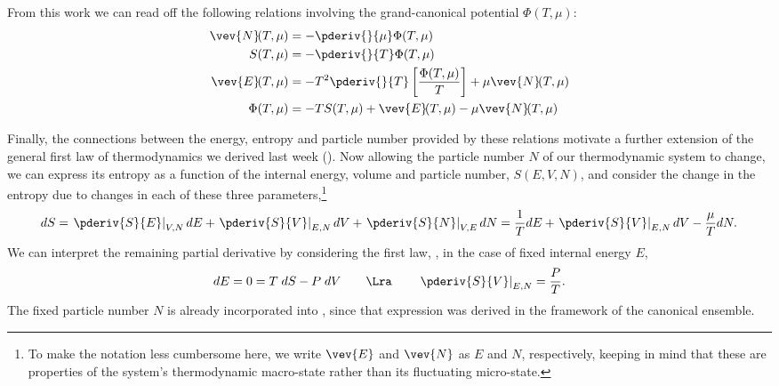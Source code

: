 \begin{shaded}
  From this work we can read off the following relations involving the grand-canonical potential $\Phi(T, \mu)$:
  \begin{align}
    \vev{N}\!(T, \mu) & = -\pderiv{}{\mu} \Phi(T, \mu) \label{eq:N_grand} \\
            S(T, \mu) & = -\pderiv{}{T} \Phi(T, \mu) \\
    \vev{E}\!(T, \mu) & = -T^2 \pderiv{}{T} \left[\frac{\Phi(T, \mu)}{T}\right] + \mu \vev{N}\!(T, \mu) \label{eq:E_grand} \\
         \Phi(T, \mu) & = -T S(T, \mu) + \vev{E}\!(T, \mu) - \mu \vev{N}\!(T, \mu) \label{eq:grand_relation}
  \end{align}
\end{shaded}

Finally, the connections between the energy, entropy and particle number provided by these relations motivate a further extension of the general first law of thermodynamics we derived last week ().
Now allowing the particle number $N$ of our thermodynamic system to change, we can express its entropy as a function of the internal energy, volume and particle number, $S(E, V, N)$, and consider the change in the entropy due to changes in each of these three parameters,\footnote{To make the notation less cumbersome here, we write $\vev{E}$ and $\vev{N}$ as $E$ and $N$, respectively, keeping in mind that these are properties of the system's thermodynamic macro-state rather than its fluctuating micro-state.}
\begin{equation*}
  dS = \left.\pderiv{S}{E}\right|_{V, N} dE + \left.\pderiv{S}{V}\right|_{E, N} dV + \left.\pderiv{S}{N}\right|_{V, E} dN = \frac{1}{T} dE + \left.\pderiv{S}{V}\right|_{E, N} dV - \frac{\mu}{T} dN.
\end{equation*}
We can interpret the remaining partial derivative by considering the first law, , in the case of fixed internal energy $E$,
\begin{equation*}
  dE = 0 = T \; dS - P \; dV \qquad \Lra \qquad \left.\pderiv{S}{V}\right|_{E, N} = \frac{P}{T}.
\end{equation*}
The fixed particle number $N$ is already incorporated into , since that expression was derived in the framework of the canonical ensemble.

